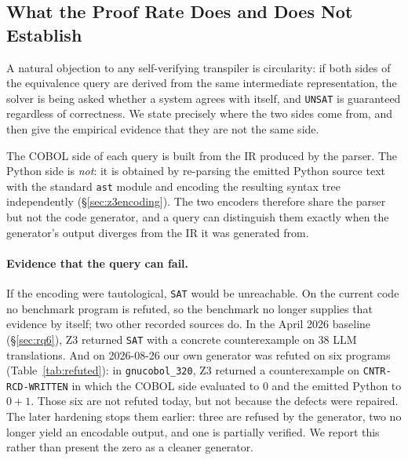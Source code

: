 \documentclass[sigconf,nonacm]{acmart}
\begin{document}
\subsection{What the Proof Rate Does and Does Not Establish}\label{sec:noncircular}

A natural objection to any self-verifying transpiler is circularity: if both sides of the equivalence query are derived from the same intermediate representation, the solver is being asked whether a system agrees with itself, and \texttt{UNSAT} is guaranteed regardless of correctness. We state precisely where the two sides come from, and then give the empirical evidence that they are not the same side.

The COBOL side of each query is built from the IR produced by the parser. The Python side is \emph{not}: it is obtained by re-parsing the emitted Python source text with the standard \texttt{ast} module and encoding the resulting syntax tree independently (\S\ref{sec:z3encoding}). The two encoders therefore share the parser but not the code generator, and a query can distinguish them exactly when the generator's output diverges from the IR it was generated from.

\paragraph{Evidence that the query can fail.} If the encoding were tautological, \texttt{SAT} would be unreachable. On the current code no benchmark program is refuted, so the benchmark no longer supplies that evidence by itself; two other recorded sources do. In the April 2026 baseline (\S\ref{sec:rq6}), Z3 returned \texttt{SAT} with a concrete counterexample on 38 LLM translations. And on 2026-08-26 our own generator was refuted on six programs (Table~\ref{tab:refuted}): in \texttt{gnucobol\_320}, Z3 returned a counterexample on \texttt{CNTR-RCD-WRITTEN} in which the COBOL side evaluated to $0$ and the emitted Python to $0+1$. Those six are not refuted today, but not because the defects were repaired. The later hardening stops them earlier: three are refused by the generator, two no longer yield an encodable output, and one is partially verified. We report this rather than present the zero as a cleaner generator.
\end{document}
